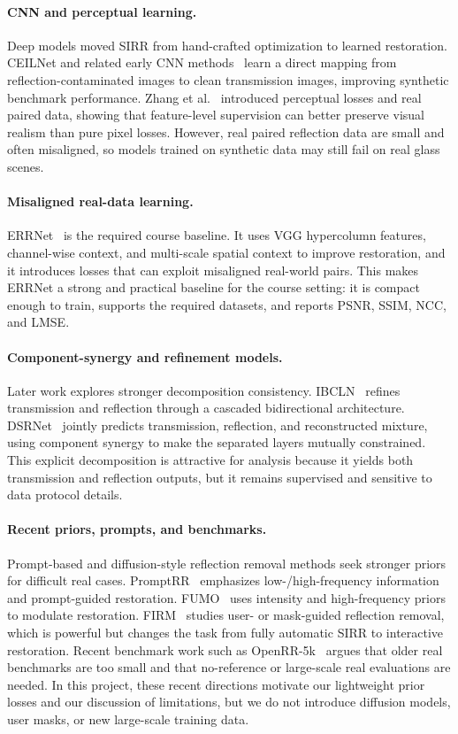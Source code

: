\documentclass[10pt,twocolumn,letterpaper]{article}
\begin{document}
\paragraph{CNN and perceptual learning.}
Deep models moved SIRR from hand-crafted optimization to learned restoration.
CEILNet and related early CNN methods~\cite{fan2017generic} learn a direct mapping from reflection-contaminated images to clean transmission images, improving synthetic benchmark performance.
Zhang et al.~\cite{zhang2018perceptual} introduced perceptual losses and real paired data, showing that feature-level supervision can better preserve visual realism than pure pixel losses.
However, real paired reflection data are small and often misaligned, so models trained on synthetic data may still fail on real glass scenes.

\paragraph{Misaligned real-data learning.}
ERRNet~\cite{wei2019errnet} is the required course baseline.
It uses VGG hypercolumn features, channel-wise context, and multi-scale spatial context to improve restoration, and it introduces losses that can exploit misaligned real-world pairs.
This makes ERRNet a strong and practical baseline for the course setting: it is compact enough to train, supports the required datasets, and reports PSNR, SSIM, NCC, and LMSE.

\paragraph{Component-synergy and refinement models.}
Later work explores stronger decomposition consistency.
IBCLN~\cite{li2020ibcln} refines transmission and reflection through a cascaded bidirectional architecture.
DSRNet~\cite{hu2023dsrnet} jointly predicts transmission, reflection, and reconstructed mixture, using component synergy to make the separated layers mutually constrained.
This explicit decomposition is attractive for analysis because it yields both transmission and reflection outputs, but it remains supervised and sensitive to data protocol details.

\paragraph{Recent priors, prompts, and benchmarks.}
Prompt-based and diffusion-style reflection removal methods seek stronger priors for difficult real cases.
PromptRR~\cite{wang2024promptrr} emphasizes low-/high-frequency information and prompt-guided restoration.
FUMO~\cite{desmon2024fumo} uses intensity and high-frequency priors to modulate restoration.
FIRM~\cite{chen2025firm} studies user- or mask-guided reflection removal, which is powerful but changes the task from fully automatic SIRR to interactive restoration.
Recent benchmark work such as OpenRR-5k~\cite{cai2025openrr} argues that older real benchmarks are too small and that no-reference or large-scale real evaluations are needed.
In this project, these recent directions motivate our lightweight prior losses and our discussion of limitations, but we do not introduce diffusion models, user masks, or new large-scale training data.
\end{document}
